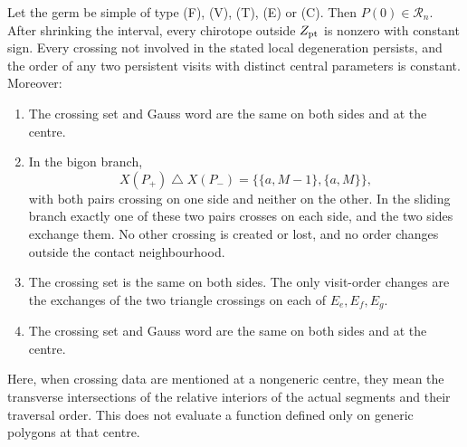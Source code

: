 \begin{lemma}\label{lem:wall-sides}\leanok
Let the germ be simple of type (F), (V), (T), (E) or (C). Then
$P(0)\in\mathcal R_n$. After shrinking the interval, every chirotope outside
$Z_{\rm pt}$ is nonzero with constant sign. Every crossing not involved in
the stated local degeneration persists, and the order of any two persistent
visits with distinct central parameters is constant. Moreover:
\begin{enumerate}
\item[(F)] The crossing set and Gauss word are the same on both sides and
at the centre.
\item[(V)] In the bigon branch,
\[
 X(P_+)\mathbin\triangle X(P_-)=\{\{a,M-1\},\{a,M\}\},
\]
with both pairs crossing on one side and neither on the other. In the sliding
branch exactly one of these two pairs crosses on each side, and the two sides
exchange them. No other crossing is created or lost, and no order changes
outside the contact neighbourhood.
\item[(T)] The crossing set is the same on both sides. The only visit-order
changes are the exchanges of the two triangle crossings on each of
$E_e,E_f,E_g$.
\item[(E),(C)] The crossing set and Gauss word are the same on both sides
and at the centre.
\end{enumerate}
Here, when crossing data are mentioned at a nongeneric centre, they mean the
transverse intersections of the relative interiors of the actual segments and
their traversal order. This does not evaluate a function defined only on
generic polygons at that centre.

\end{lemma}
